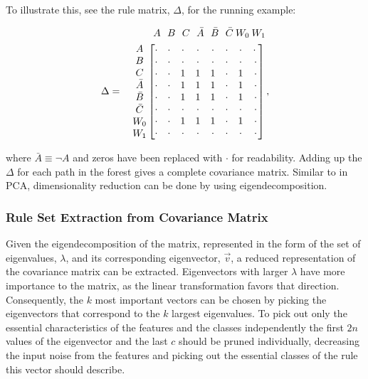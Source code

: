 \documentclass[11pt]{article}
\begin{document}
To illustrate this, see the rule matrix, $\Delta$, for the running example:
\begin{small}
\begin{align*}
&\;\:A\:\:\:B\:\:\:C\:\:\:\bar{A}\:\:\:\bar{B}\:\:\:\bar{C}\:W_0\:W_1\\
\Delta = \quad \mqty{A\\B\\C\\\bar{A}\\\bar{B}\\\bar{C}\\W_0\\W_1}\, &\mqty[\cdot&\cdot&\cdot&\cdot&\cdot&\cdot&\cdot&\cdot\:\\\cdot&\cdot&\cdot&\cdot&\cdot&\cdot&\cdot&\cdot\\\cdot&\cdot&1&1&1&\cdot&1&\cdot\\\cdot&\cdot&1&1&1&\cdot&1&\cdot\\\cdot&\cdot&1&1&1&\cdot&1&\cdot\\\cdot&\cdot&\cdot&\cdot&\cdot&\cdot&\cdot&\cdot\\\cdot&\cdot&1&1&1&\cdot&1&\cdot\\\cdot&\cdot&\cdot&\cdot&\cdot&\cdot&\cdot&\cdot] \, ,
\end{align*}
\end{small}
where $\bar{A} \equiv \neg A$ and zeros have been replaced with $\cdot$ for readability. Adding up the $\Delta$ for each path in the forest gives a complete covariance matrix. Similar to in PCA, dimensionality reduction can be done by using eigendecomposition.

\subsubsection{Rule Set Extraction from Covariance Matrix}
Given the eigendecomposition of the matrix, represented in the form of the set of eigenvalues, $\lambda$, and its corresponding eigenvector, $\vec{v}$, a reduced representation of the covariance matrix can be extracted. Eigenvectors with larger $\lambda$ have more importance to the matrix, as the linear transformation favors that direction. Consequently, the $k$ most important vectors can be chosen by picking the eigenvectors that correspond to the $k$ largest eigenvalues. To pick out only the essential characteristics of the features and the classes independently the first $2n$ values of the eigenvector and the last $c$ should be pruned individually, decreasing the input noise from the features and picking out the essential classes of the rule this vector should describe. 
\end{document}

